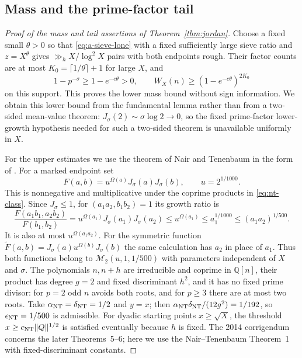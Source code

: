 \documentclass[11pt]{article}
\theoremstyle{definition}
\theoremstyle{remark}
\numberwithin{equation}{section}
\newcommand{\Q}{\mathbb Q}
\begin{document}
\subsection{Mass and the prime-factor tail}
\begin{proof}[Proof of the mass and tail assertions of Theorem~\ref{thm:jordan}]
Choose a fixed small $\theta>0$ so that \eqref{eq:a-sieve-lone} with a fixed sufficiently large sieve ratio
and $z=X^\theta$ gives $\gg_hX/\log^2X$ pairs with both endpoints rough.
Their factor counts are at most $K_0=\lceil1/\theta\rceil+1$ for large $X$, and
\begin{equation}\label{eq:a-j-lower}
 1-p^{-\sigma}\ge1-e^{-c\theta}>0,\qquad
 W_X(n)\ge(1-e^{-c\theta})^{2K_0}
\end{equation}
on this support. This proves the lower mass bound without sign information.
We obtain this lower bound from the fundamental lemma rather than from a two-sided mean-value theorem:
$J_\sigma(2)\sim\sigma\log2\to0$, so the fixed prime-factor lower-growth hypothesis needed for such a
two-sided theorem is unavailable uniformly in $X$.

For the upper estimates we use the theorem of Nair and Tenenbaum \cite{NairTenenbaum} in the form of
\cite[Theorem~1]{Henriot}. For a marked endpoint set
\begin{equation}\label{eq:a-nt-function}
 F(a,b)=u^{\Omega(a)}J_\sigma(a)J_\sigma(b),\qquad u=2^{1/1000}.
\end{equation}
This is nonnegative and multiplicative under the coprime products in \eqref{eq:nt-class}.
Since $J_\sigma\le1$, for $(a_1a_2,b_1b_2)=1$ its growth ratio is
\begin{equation}\label{eq:nt-growth}
 \frac{F(a_1b_1,a_2b_2)}{F(b_1,b_2)}
 =u^{\Omega(a_1)}J_\sigma(a_1)J_\sigma(a_2)
 \le u^{\Omega(a_1)}\le a_1^{1/1000}\le(a_1a_2)^{1/500}.
\end{equation}
It is also at most $u^{\Omega(a_1a_2)}$.
For the symmetric function $\widetilde F(a,b)=J_\sigma(a)u^{\Omega(b)}J_\sigma(b)$ the same calculation
has $a_2$ in place of $a_1$. Thus both functions belong to
$\mathcal M_2(u,1,1/500)$ with parameters independent of $X$ and $\sigma$. The polynomials $n,n+h$ are irreducible and coprime in $\Q[n]$,
their product has degree $g=2$ and fixed discriminant $h^2$, and it has no fixed prime divisor:
for $p=2$ odd $n$ avoids both roots, and for $p\ge3$ there are at most two roots.
Take $\alpha_{\rm NT}=\delta_{\rm NT}=1/2$ and $y=x$; then
$\alpha_{\rm NT}\delta_{\rm NT}/(12g^2)=1/192$, so $\epsilon_{\rm NT}=1/500$ is admissible.
For dyadic starting points $x\ge\sqrt X$, the threshold
$x\ge c_{\rm NT}\|Q\|^{1/2}$ is satisfied eventually because $h$ is fixed. The 2014 corrigendum \cite{HenriotErratum} concerns the later
Theorems~5--6; here we use the Nair--Tenenbaum Theorem~1 with fixed-discriminant constants.


\end{proof}
\end{document}
